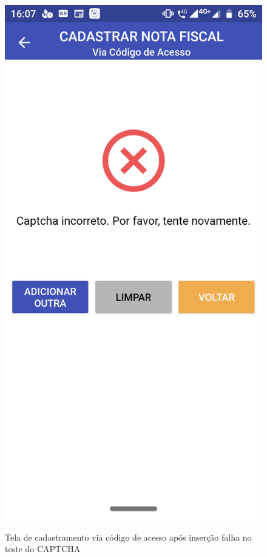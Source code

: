 \newpage
\begin{figure}[h]
    \centering
    \caption{Tela de cadastramento via código de acesso após inserção falha no teste do CAPTCHA}
    \includegraphics[scale=0.15]{tcc/figures/app/app_codigo_acesso_erro_captcha.png}
    \label{appCodigoAcessoErroCaptchaFig}
\end{figure}

